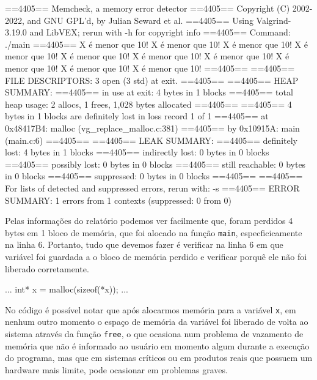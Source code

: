 \newpage
\begin{exterminal}
    ==4405== Memcheck, a memory error detector
    ==4405== Copyright (C) 2002-2022, and GNU GPL'd, by Julian Seward et al.
    ==4405== Using Valgrind-3.19.0 and LibVEX; rerun with -h for copyright info
    ==4405== Command: ./main
    ==4405== 
    X é menor que 10!
    X é menor que 10!
    X é menor que 10!
    X é menor que 10!
    X é menor que 10!
    X é menor que 10!
    X é menor que 10!
    X é menor que 10!
    X é menor que 10!
    X é menor que 10!
    ==4405== 
    ==4405== FILE DESCRIPTORS: 3 open (3 std) at exit.
    ==4405== 
    ==4405== HEAP SUMMARY:
    ==4405==     in use at exit: 4 bytes in 1 blocks
    ==4405==   total heap usage: 2 allocs, 1 frees, 1,028 bytes allocated
    ==4405== 
    ==4405== 4 bytes in 1 blocks are definitely lost in loss record 1 of 1
    ==4405==    at 0x48417B4: malloc (vg_replace_malloc.c:381)
    ==4405==    by 0x10915A: main (main.c:6)
    ==4405== 
    ==4405== LEAK SUMMARY:
    ==4405==    definitely lost: 4 bytes in 1 blocks
    ==4405==    indirectly lost: 0 bytes in 0 blocks
    ==4405==      possibly lost: 0 bytes in 0 blocks
    ==4405==    still reachable: 0 bytes in 0 blocks
    ==4405==         suppressed: 0 bytes in 0 blocks
    ==4405== 
    ==4405== For lists of detected and suppressed errors, rerun with: -s
    ==4405== ERROR SUMMARY: 1 errors from 1 contexts (suppressed: 0 from 0)
\end{exterminal}
\newpage

Pelas informações do relatório podemos ver facilmente que, foram perdidos 4 bytes em 1 bloco de memória, que foi alocado na função 
\texttt{main}, especficicamente na linha 6. Portanto, tudo que devemos fazer é verificar na linha 6 em que variável foi guardada a 
o bloco de memória perdido e verificar porquê ele não foi liberado corretamente.

\begin{excode}
    ...
    int* x = malloc(sizeof(*x));
    ...
\end{excode}

No código é possível notar que após alocarmos memória para a variável \texttt{x}, em nenhum outro momento o espaço de memória da 
variável foi liberado de volta ao sistema através da função \texttt{free}, o que ocasiona num problema de vazamento de memória que 
não é informado ao usuário em momento algum durante a execução do programa, mas que em sistemas críticos ou em produtos reais que 
possuem um hardware mais limite, pode ocasionar em problemas graves.

